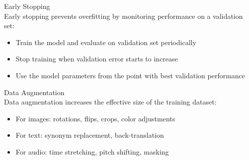 \begin{definition}{Early Stopping}\\
Early stopping prevents overfitting by monitoring performance on a validation set:
\begin{itemize}
    \item Train the model and evaluate on validation set periodically
    \item Stop training when validation error starts to increase
    \item Use the model parameters from the point with best validation performance
\end{itemize}
\end{definition}

\begin{definition}{Data Augmentation}\\
Data augmentation increases the effective size of the training dataset:
\begin{itemize}
    \item For images: rotations, flips, crops, color adjustments
    \item For text: synonym replacement, back-translation
    \item For audio: time stretching, pitch shifting, masking
\end{itemize}
\end{definition}

